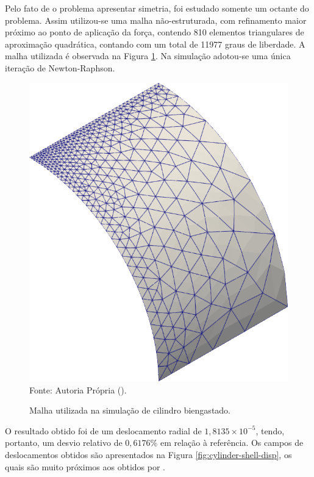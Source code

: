 Pelo fato de o problema apresentar simetria, foi estudado somente um octante do problema. Assim utilizou-se uma malha não-estruturada, com refinamento maior próximo ao ponto de aplicação da força, contendo 810 elementos triangulares de aproximação quadrática, contando com um total de 11977 graus de liberdade. A malha utilizada é observada na Figura \ref{fig:cylinder-shell-mesh}. Na simulação adotou-se uma única iteração de Newton-Raphson.

\begin{figure}[h!]
    \centering
    \caption{Malha utilizada na simulação de cilindro biengastado.}
    \includegraphics[width=0.3\linewidth]{Figuras/cylinder-shell/mesh1.png}
    \\Fonte: Autoria Própria (\the\year).
    \label{fig:cylinder-shell-mesh}
\end{figure}

O resultado obtido foi de um deslocamento radial de $1,8135\times10^{-5}$, tendo, portanto, um desvio relativo de $0,6176\%$ em relação à referência. Os campos de deslocamentos obtidos são apresentados na Figura \ref{fig:cylinder-shell-disp}, os quais são muito próximos aos obtidos por .

